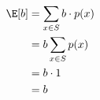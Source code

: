 
\begin{align*}
\E[b]
&= \sum_{x \in S} b \cdot p(x) \\
&= b \sum_{x \in S} p(x) \\
&= b \cdot 1 \\
&= b
\end{align*}
    
